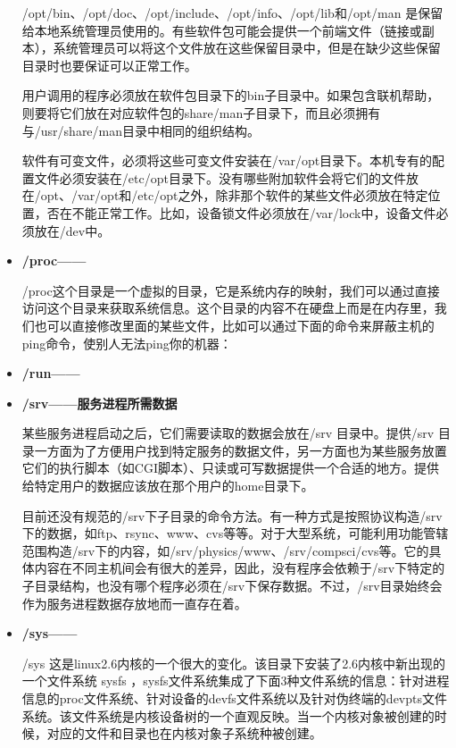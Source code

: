 \begin{itemize}
\qquad /opt/bin、/opt/doc、/opt/include、/opt/info、/opt/lib和/opt/man 是保留给本地系统管理员使用的。有些软件包可能会提供一个前端文件（链接或副本），系统管理员可以将这个文件放在这些保留目录中，但是在缺少这些保留目录时也要保证可以正常工作。

\qquad 用户调用的程序必须放在软件包目录下的bin子目录中。如果包含联机帮助，则要将它们放在对应软件包的share/man子目录下，而且必须拥有与/usr/share/man目录中相同的组织结构。

\qquad 软件有可变文件，必须将这些可变文件安装在/var/opt目录下。本机专有的配置文件必须安装在/etc/opt目录下。没有哪些附加软件会将它们的文件放在/opt、/var/opt和/etc/opt之外，除非那个软件的某些文件必须放在特定位置，否在不能正常工作。比如，设备锁文件必须放在/var/lock中，设备文件必须放在/dev中。

\item \textbf{/proc——}

\qquad /proc这个目录是一个虚拟的目录，它是系统内存的映射，我们可以通过直接访问这个目录来获取系统信息。这个目录的内容不在硬盘上而是在内存里，我们也可以直接修改里面的某些文件，比如可以通过下面的命令来屏蔽主机的ping命令，使别人无法ping你的机器：

\item \textbf{/run——}

\item \textbf{/srv——服务进程所需数据}

\qquad 某些服务进程启动之后，它们需要读取的数据会放在/srv 目录中。提供/srv 目录一方面为了方便用户找到特定服务的数据文件，另一方面也为某些服务放置它们的执行脚本（如CGI脚本）、只读或可写数据提供一个合适的地方。提供给特定用户的数据应该放在那个用户的home目录下。

\qquad 目前还没有规范的/srv下子目录的命令方法。有一种方式是按照协议构造/srv下的数据，如ftp、rsync、www、cvs等等。对于大型系统，可能利用功能管辖范围构造/srv下的内容，如/srv/physics/www、/srv/compsci/cvs等。它的具体内容在不同主机间会有很大的差异，因此，没有程序会依赖于/srv下特定的子目录结构，也没有哪个程序必须在/srv下保存数据。不过，/srv目录始终会作为服务进程数据存放地而一直存在着。

\item \textbf{/sys——}

\qquad /sys 这是linux2.6内核的一个很大的变化。该目录下安装了2.6内核中新出现的一个文件系统 sysfs ，sysfs文件系统集成了下面3种文件系统的信息：针对进程信息的proc文件系统、针对设备的devfs文件系统以及针对伪终端的devpts文件系统。该文件系统是内核设备树的一个直观反映。当一个内核对象被创建的时候，对应的文件和目录也在内核对象子系统种被创建。


\end{itemize}
